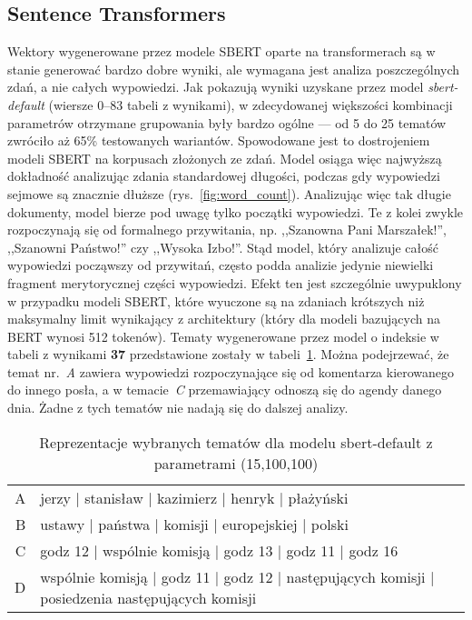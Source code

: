 	\subsection{Sentence Transformers}
		Wektory wygenerowane przez modele SBERT oparte na transformerach są w stanie generować bardzo dobre wyniki,
			ale wymagana jest analiza poszczególnych zdań, a nie całych wypowiedzi.
		Jak pokazują wyniki uzyskane przez model \emph{sbert-default} (wiersze 0--83 tabeli z wynikami),
			w zdecydowanej większości kombinacji parametrów otrzymane grupowania były bardzo ogólne --- od 5 do 25 tematów zwróciło aż 65\% testowanych wariantów.
		Spowodowane jest to dostrojeniem modeli SBERT na korpusach złożonych ze zdań.
		Model osiąga więc najwyższą dokładność analizując zdania standardowej długości, podczas gdy wypowiedzi sejmowe są znacznie dłuższe (rys.~\ref{fig:word_count}).
		Analizując więc tak długie dokumenty, model bierze pod uwagę tylko początki wypowiedzi.
		Te z kolei zwykle rozpoczynają się od formalnego przywitania, np. ,,Szanowna Pani Marszałek!'', ,,Szanowni Państwo!'' czy ,,Wysoka Izbo!''.
		Stąd model, który analizuje całość wypowiedzi począwszy od przywitań, często podda analizie jedynie niewielki fragment merytorycznej części wypowiedzi.
		Efekt ten jest szczególnie uwypuklony w przypadku modeli SBERT, które wyuczone są na zdaniach krótszych niż maksymalny limit wynikający z architektury
			(który dla modeli bazujących na BERT wynosi 512 tokenów).
		Tematy wygenerowane przez model o indeksie w tabeli z wynikami \textbf{37} przedstawione zostały w tabeli~\ref{tab:sbert_default_topics}.
		Można podejrzewać, że temat nr.~\emph{A} zawiera wypowiedzi rozpoczynające się od komentarza kierowanego do innego posła, a w temacie~\emph{C} przemawiający odnoszą się do agendy danego dnia.
		Żadne z tych tematów nie nadają się do dalszej analizy.

		\begin{table}[htb]
			\caption{Reprezentacje wybranych tematów dla modelu sbert-default z parametrami (15,100,100)}\label{tab:sbert_default_topics} %
			\centering
			\small
			\begin{tabularx}{\textwidth}{rl}
				\toprule
				A & jerzy | stanisław | kazimierz | henryk | płażyński \\
				B & ustawy | państwa | komisji | europejskiej | polski \\
				C & godz 12 | wspólnie komisją | godz 13 | godz 11 | godz 16 \\
				D & wspólnie komisją | godz 11 | godz 12 | następujących komisji | posiedzenia następujących komisji \\
				\bottomrule
			\end{tabularx}
		\end{table}

